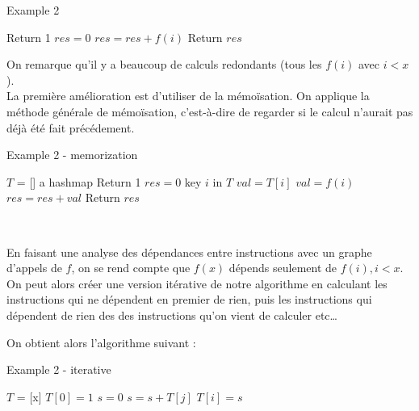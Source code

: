 \documentclass[
  paper=a4,
  ,captions=tableheading
]{scrartcl}
\begin{document}
\begin{algorithm}[H]
\caption{Example 2}
\begin{algorithmic}[4]
  \Statex
      \State Return 1
    \EndIf
    \State $res = 0$
      \State $res = res + f(i)$
    \EndFor
  \State Return $res$
\EndFunction
\end{algorithmic}
\end{algorithm}

On remarque qu'il y a beaucoup de calculs redondants (tous les \(f(i)\)
avec \(i<x\)).\\
La première amélioration est d'utiliser de la mémoïsation. On applique
la méthode générale de mémoïsation, c'est-à-dire de regarder si le
calcul n'aurait pas déjà été fait précédement.

\begin{algorithm}[H]
\caption{Example 2 - memorization}
\begin{algorithmic}[5]
\Statex
\State $T$ = [] a hashmap
      \State Return 1
    \EndIf
    \State $res = 0$
      \If key $i$ in $T$
        \State $val = T[i]$
      \Else
        \State $val = f(i)$
      \EndIf
      \State $res = res + val$
    \EndFor
  \State Return $res$
  \EndFunction
\end{algorithmic}
\end{algorithm}

~

En faisant une analyse des dépendances entre instructions avec un graphe
d'appels de \(f\), on se rend compte que \(f(x)\) dépends seulement de
\(f(i), i<x\). On peut alors créer une version itérative de notre
algorithme en calculant les instructions qui ne dépendent en premier de
rien, puis les instructions qui dépendent de rien des des instructions
qu'on vient de calculer etc\ldots{}

On obtient alors l'algorithme suivant :

\begin{algorithm}[H]
\caption{Example 2 - iterative}
\begin{algorithmic}[6]
\Statex
    \State $T$ = [x]
    \State $T[0] = 1$
      \State $s=0$
        \State $s = s + T[j]$
      \EndFor
      \State $T[i] = s$
    \EndFor
  \EndFunction
\end{algorithmic}
\end{algorithm}
\end{document}
